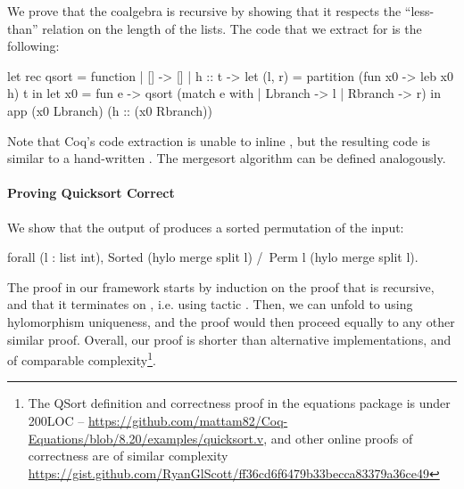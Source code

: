 \documentclass[a4paper,anonymous, UKenglish,cleveref, autoref, thm-restate]{lipics-v2021}
\begin{document}
We prove that the coalgebra  is recursive by showing
that it respects the ``less-than'' relation on the length of the lists.
%
The code that we extract for  is the following:
\begin{ocamlcode}
let rec qsort = function
| [] -> [] | h :: t ->
  let (l, r) = partition (fun x0 -> leb x0 h) t in
  let x0 = fun e -> qsort (match e with | Lbranch -> l | Rbranch -> r) in
  app (x0 Lbranch) (h :: (x0 Rbranch))
\end{ocamlcode}
Note that Coq's code extraction is unable to inline , but the resulting
code is similar to a hand-written .
The mergesort algorithm can be defined analogously.

\paragraph*{Proving Quicksort Correct}

We show that the output of  produces a sorted
permutation of the input:
\begin{coqcode}
forall (l : list int), Sorted (hylo merge split l) /\ Perm l (hylo merge split l).
\end{coqcode}
The proof in our framework starts by induction on the proof that 
is recursive, and that it terminates on , i.e. using tactic
. Then, we can unfold
 to  using
hylomorphism uniqueness, and the proof would then proceed equally to any other
similar proof. Overall, our proof is shorter than alternative implementations, and of comparable complexity\footnote{The QSort definition and
correctness proof in the equations package is under 200LOC --
\href{https://github.com/mattam82/Coq-Equations/blob/8.20/examples/quicksort.v}{https://github.com/mattam82/Coq-Equations/blob/8.20/examples/quicksort.v},
and other online proofs of correctness are of similar complexity
\href{https://gist.github.com/RyanGlScott/ff36cd6f6479b33becca83379a36ce49}{https://gist.github.com/RyanGlScott/ff36cd6f6479b33becca83379a36ce49}}.
\end{document}
